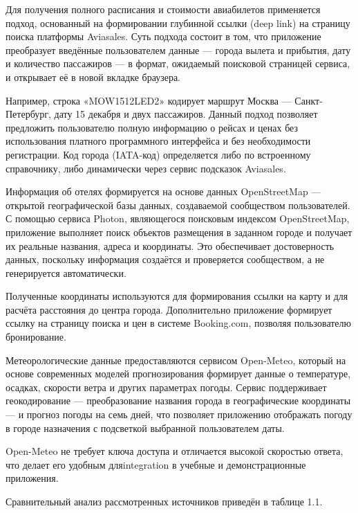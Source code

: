 \documentclass[14pt,a4paper,oneside]{extreport}
\begin{document}
Для получения полного расписания и стоимости авиабилетов применяется подход, основанный на формировании глубинной ссылки (deep link) на страницу поиска платформы Aviasales. Суть подхода состоит в том, что приложение преобразует введённые пользователем данные — города вылета и прибытия, дату и количество пассажиров — в формат, ожидаемый поисковой страницей сервиса, и открывает её в новой вкладке браузера.

Например, строка «MOW1512LED2» кодирует маршрут Москва — Санкт-Петербург, дату 15 декабря и двух пассажиров. Данный подход позволяет предложить пользователю полную информацию о рейсах и ценах без использования платного программного интерфейса и без необходимости регистрации. Код города (IATA-код) определяется либо по встроенному справочнику, либо динамически через сервис подсказок Aviasales.

Информация об отелях формируется на основе данных OpenStreetMap — открытой географической базы данных, создаваемой сообществом пользователей. С помощью сервиса Photon, являющегося поисковым индексом OpenStreetMap, приложение выполняет поиск объектов размещения в заданном городе и получает их реальные названия, адреса и координаты. Это обеспечивает достоверность данных, поскольку информация создаётся и проверяется сообществом, а не генерируется автоматически.

Полученные координаты используются для формирования ссылки на карту и для расчёта расстояния до центра города. Дополнительно приложение формирует ссылку на страницу поиска и цен в системе Booking.com, позволяя пользователю бронирование.

Метеорологические данные предоставляются сервисом Open-Meteo, который на основе современных моделей прогнозирования формирует данные о температуре, осадках, скорости ветра и других параметрах погоды. Сервис поддерживает геокодирование — преобразование названия города в географические координаты — и прогноз погоды на семь дней, что позволяет приложению отображать погоду в городе назначения с подсветкой выбранной пользователем даты.

Open-Meteo не требует ключа доступа и отличается высокой скоростью ответа, что делает его удобным дляintegration в учебные и демонстрационные приложения.

Сравнительный анализ рассмотренных источников приведён в таблице 1.1.
\end{document}
